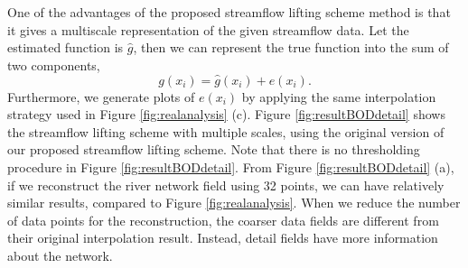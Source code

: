\documentclass[11pt,titlepage]{article}
\begin{document}
One of the advantages of the proposed streamflow lifting scheme method is that it gives a multiscale representation of the given streamflow data. %
Let the estimated function is $\hat{g}$, then we can represent the true function into the sum of two components,
\[ g(x_i) = \hat{g}(x_i) + e(x_i). \]
Furthermore, we generate plots of $e(x_i)$ by applying the same interpolation strategy used in Figure \ref{fig:realanalysis} (c). 
Figure \ref{fig:resultBODdetail} shows the streamflow lifting scheme with multiple scales, using the original version of our proposed streamflow lifting scheme. Note that there is no thresholding procedure in Figure \ref{fig:resultBODdetail}. 
From Figure \ref{fig:resultBODdetail} (a), if we reconstruct the river network field using 32 points, we can have relatively similar results, compared to Figure \ref{fig:realanalysis}. When we reduce the number of data points for the reconstruction, the coarser data fields are different from their original interpolation result. Instead, detail fields have more information about the network.





%

%
%
\end{document}
